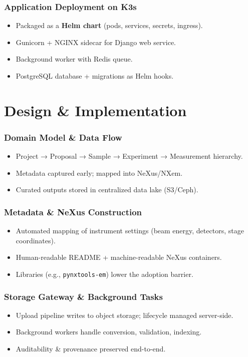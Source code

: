 \documentclass{beamer}
\begin{document}
\begin{frame}
	\frametitle{Application Deployment on K3s}
	\begin{itemize}
		\item Packaged as a \textbf{Helm chart} (pods, services, secrets, ingress).
		\item Gunicorn + NGINX sidecar for Django web service.
		\item Background worker with Redis queue.
		\item PostgreSQL database + migrations as Helm hooks.
	\end{itemize}
\end{frame}


\section{Design \& Implementation}

\begin{frame}
    \frametitle{Domain Model \& Data Flow}
    \begin{itemize}
        \item Project → Proposal → Sample → Experiment → Measurement hierarchy.
        \item Metadata captured early; mapped into NeXus/NXem.
        \item Curated outputs stored in centralized data lake (S3/Ceph).
    \end{itemize}
\end{frame}

\begin{frame}
    \frametitle{Metadata \& NeXus Construction}
    \begin{itemize}
        \item Automated mapping of instrument settings (beam energy, detectors, stage coordinates).
        \item Human-readable README + machine-readable NeXus containers.
        \item Libraries (e.g., \texttt{pynxtools-em}) lower the adoption barrier.
    \end{itemize}
\end{frame}

\begin{frame}
    \frametitle{Storage Gateway \& Background Tasks}
    \begin{itemize}
        \item Upload pipeline writes to object storage; lifecycle managed server-side.
        \item Background workers handle conversion, validation, indexing.
        \item Auditability \& provenance preserved end-to-end.
    \end{itemize}
\end{frame}
\end{document}
